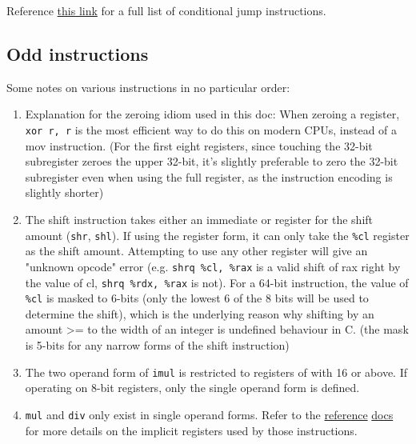 \documentclass[11pt]{article}
\begin{document}
Reference \href{https://www.felixcloutier.com/x86/jcc}{this link} for a full list of
conditional jump instructions.

\subsection{Odd instructions}

Some notes on various instructions in no particular order:

\begin{enumerate}
    \item Explanation for the zeroing idiom used in this doc: When zeroing a register,
        \texttt{xor r, r} is the most efficient way to do this on modern CPUs, instead of
        a mov instruction. (For the first eight registers, since touching the 32-bit
        subregister zeroes the upper 32-bit, it's slightly preferable to zero the 32-bit
        subregister even when using the full register, as the instruction encoding is
        slightly shorter)

    \item The shift instruction takes either an immediate or register for the shift amount
        (\texttt{shr}, \texttt{shl}). If using the register form, it can only take the
        \texttt{\%cl} register as the shift amount. Attempting to use any other register
        will give an "unknown opcode" error (e.g. \texttt{shrq \%cl, \%rax} is a valid
        shift of rax right by the value of cl, \texttt{shrq \%rdx, \%rax} is not). For a
        64-bit instruction, the value of \texttt{\%cl} is masked to 6-bits (only the
        lowest 6 of the 8 bits will be used to determine the shift), which is the
        underlying reason why shifting by an amount >= to the width of an integer is
        undefined behaviour in C. (the mask is 5-bits for any narrow forms of the shift
        instruction)

    \item The two operand form of \texttt{imul} is restricted to registers of with 16 or
        above. If operating on 8-bit registers, only the single operand form is defined.

    \item \texttt{mul} and \texttt{div} only exist in single operand forms. Refer to the
        \href{https://www.felixcloutier.com/x86/mul}{reference}
        \href{https://www.felixcloutier.com/x86/div}{docs} for more details on the
        implicit registers used by those instructions.


\end{enumerate}
\end{document}
